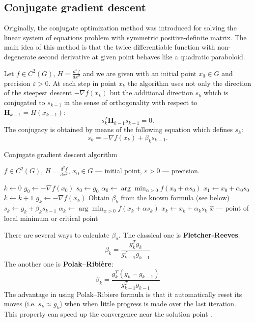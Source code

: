 \documentclass[12pt, bachelor, substylefile = algo_title.rtx]{disser}
\newcommand{\eps}{\varepsilon}
\theoremstyle{definition}
\begin{document}
\subsection{Conjugate gradient descent}
Originally, the conjugate optimization method was introduced for solving the linear system of equations problem with symmetric positive-definite matrix. The main idea of this method is that the twice differentiable function with non-degenerate second derivative at given point behaves like a quadratic paraboloid. 

Let $f \in C^2(G)$, $H = \frac{d^2 f}{dx^2}$ and we are given with an initial point $x_0 \in G$ and precision $\eps > 0$. At each step in point $x_k$ the algorithm uses not only the direction of the steepest descent $-\nabla f(x_k)$ but the additional direction $s_k$ which is conjugated to $s_{k-1}$ in the sense of orthogonality with respect to $\mathbf{H}_{k-1} = H(x_{k-1})$:
\[ s_k ^{T} \mathbf{H}_{k-1} s_{k-1} = 0. \]
The conjugacy is obtained by means of the following equation which defines $s_k$:
\[ s_k = -\nabla f(x_k) + \beta_k s_{k-1}. \]

\begin{algorithm}[h]
\caption{Conjugate gradient descent algorithm}
\label{alg: conjgrad}
\begin{algorithmic}

\Require $f \in C^2(G)$, $H = \frac{d^2 f}{dx^2}$, $x_0 \in G$ --- initial point, $\eps>0$ --- precision. 

\State $k \gets 0$
\State $g_0 \gets -\nabla f(x_0)$
\State $s_0 \gets g_0$
\State $\alpha_0 \gets \arg \min_{\alpha>0} f(x_0 + \alpha s_0)$
\State $x_1 \gets x_0 + \alpha_0 s_0$
\While{$\|x_k - x_{k-1}\| > \eps$}
\State $k \gets k+1$
\State $g_k \gets -\nabla f(x_k)$
\State Obtain $\beta_k$ from the known formula (see below)
\State $s_k \gets g_k + \beta_k s_{k-1}$
\State $\alpha_k \gets \arg \min_{\alpha>0} f(x_k + \alpha s_k)$
\State $x_k \gets x_k + \alpha_k s_k$
\EndWhile
\Ensure $\widehat{x}$ --- point of local minimum or critical point
\end{algorithmic}
\end{algorithm}


There are several ways to calculate $\beta_n$. The classical one is \textbf{Fletcher-Reeves}:
\[ \beta_k = \frac{g^T_k g_k}{g^T_{k-1} g_{k-1}} \]
The another one is \textbf{Polak–Ribière}:
\[ \beta_k = \frac{g^T_k (g_k - g_{k-1})}{g^T_{k-1} g_{k-1}} \]
The advantage in using Polak–Ribiere formula is that it automatically reset its moves (i.e. $s_k \approx g_k$) when when little progress is made over the last iteration. This property can speed up the convergence near the solution point \cite{cavazzuti13}.
\end{document}
